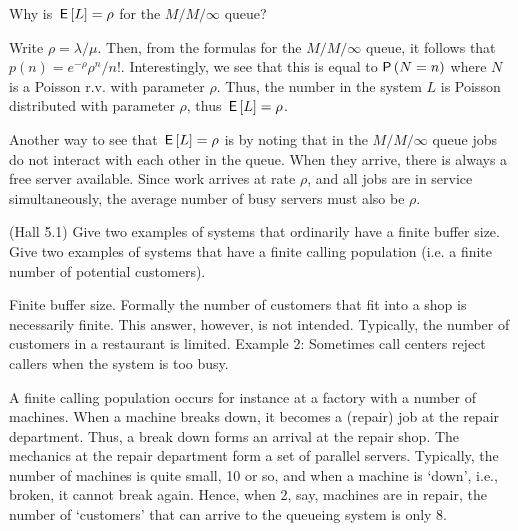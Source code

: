 \begin{exercise}[\faFlask]
 Why is $\,\mathsf{E}\left[L\right]=\rho$ for the $M/M/\infty$ queue? 
 \begin{solution}
 Write $\rho = \lambda /\mu$. Then, from the formulas for the
   $M/M/\infty$ queue, it follows that $p(n) = e^{-\rho} \rho^n/n!$.
   Interestingly, we see that this is equal to $\P{N=n}$ where $N$ is
   a Poisson r.v.  with parameter $\rho$. Thus, the number in the
   system $L$ is Poisson distributed with parameter $\rho$, thus
   $\,\mathsf{E}\left[L\right] = \rho$.

   Another way to see that $\,\mathsf{E}\left[L\right]=\rho$ is by noting that in the
   $M/M/\infty$ queue jobs do not interact with each other in the
   queue. When they arrive, there is always a free server
   available. Since work arrives at rate $\rho$, and all jobs are in
   service simultaneously, the average number of busy servers must
   also be $\rho$.
\end{solution}
\end{exercise}


\begin{exercise}[\faPhoto](Hall 5.1) Give two examples of systems that
  ordinarily have a finite buffer size. Give two examples of systems
  that have a finite calling population (i.e. a finite number of potential customers).
  \begin{solution}
Finite buffer size. Formally the number of customers that fit into a
shop is necessarily finite. This answer, however, is not
intended. Typically, the number of customers in a restaurant is
limited. Example 2: Sometimes call centers reject callers when the system is too busy.

A finite calling population occurs for instance at a factory with a
number of machines. When a machine breaks down, it becomes a (repair)
job at the repair department.  Thus, a break down forms an arrival at
the repair shop.  The mechanics at the repair department form a set of
parallel servers. Typically, the number of machines is quite small, 10 or
so, and when a machine is `down', i.e., broken, it cannot break again.
Hence, when 2, say, machines are in repair, the number of `customers'
that can arrive to the queueing system is only 8. 
  \end{solution}
\end{exercise}


